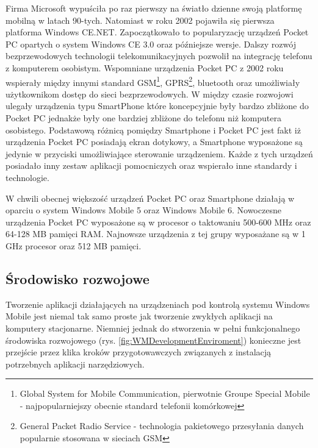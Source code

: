 Firma Microsoft wypuściła po raz pierwszy na światło dzienne swoją platformę
mobilną w latach 90-tych\cite{blog:wm-app-dev}. Natomiast w roku 2002 pojawiła
się pierwsza platforma Windows CE.NET. Zapoczątkowało to popularyzację urządzeń
Pocket PC opartych o system Windows CE 3.0 oraz późniejsze wersje. Dalszy rozwój
bezprzewodowych technologii telekomunikacyjnych pozwolił na integrację telefonu z
komputerem osobistym. Wspomniane urządzenia Pocket PC z 2002 roku wspierały
między innymi standard GSM\footnote{Global System for Mobile Communication,
pierwotnie Groupe Special Mobile - najpopularniejszy obecnie standard telefonii
komórkowej}, GPRS\footnote{General Packet Radio Service - technologia pakietowego
przesyłania danych popularnie stosowana w sieciach GSM}, bluetooth oraz
umożliwiały użytkownikom dostęp do sieci bezprzewodowych. W między czasie
rozwojowi ulegały urządzenia typu SmartPhone które koncepcyjnie były bardzo
zbliżone do Pocket PC jednakże były one bardziej zbliżone do telefonu niż
komputera osobistego. Podstawową różnicą pomiędzy Smartphone i Pocket PC jest
fakt iż urządzenia Pocket PC posiadają ekran dotykowy, a Smartphone wyposażone są
jedynie w przyciski umożliwiające sterowanie urządzeniem. Każde z tych urządzeń
posiadało inny zestaw aplikacji pomocniczych oraz wspierało inne standardy i
technologie.

W chwili obecnej większość urządzeń Pocket PC oraz Smartphone działają w oparciu
o system Windows Mobile 5 oraz Windows Mobile 6. Nowoczesne urządzenia Pocket PC
wyposażone są w procesor o taktowaniu 500-600 MHz oraz 64-128 MB pamięci RAM.
Najnowsze urządzenia z tej grupy wyposażane są w 1 GHz procesor oraz 512 MB
pamięci.

\subsection{Środowisko rozwojowe}
Tworzenie aplikacji działających na urządzeniach pod kontrolą systemu Windows
Mobile jest niemal tak samo proste jak tworzenie zwykłych aplikacji na komputery
stacjonarne. Niemniej jednak do stworzenia w pełni funkcjonalnego środowiska
rozwojowego (rys. \ref{fig:WMDevelopmentEnviroment}) konieczne jest przejście przez klika kroków przygotowawczych
związanych z instalacją potrzebnych aplikacji narzędziowych.

